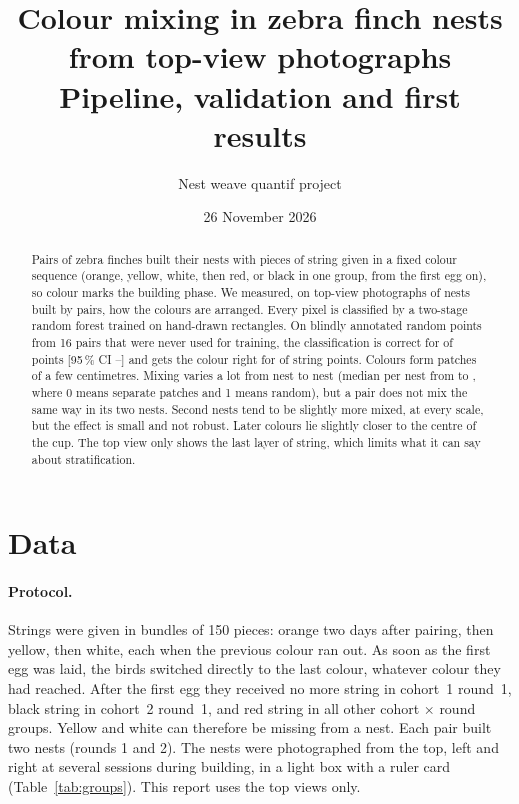 \documentclass[11pt,a4paper]{article}
\title{Colour mixing in zebra finch nests from top-view photographs\\[2pt]
\large Pipeline, validation and first results}
\author{Nest weave quantif project}
\date{26 November 2026}
\begin{document}
\maketitle

\begin{abstract}
Pairs of zebra finches built their nests with pieces of string given in a fixed colour sequence
(orange, yellow, white, then red, or black in one group, from the first egg on), so colour marks
the building phase. We measured, on \nphotos{} top-view photographs of \nnests{} nests built by
\npairs{} pairs, how the colours are arranged. Every pixel is classified by a two-stage random
forest trained on hand-drawn rectangles. On \valn{} blindly annotated random points from 16 pairs
that were never used for training, the classification is correct for \valacc{} of points
[95\,\% CI \valacclo--\valacchi] and gets the colour right for \valcolourok{} of string points.
Colours form patches of a few centimetres. Mixing varies a lot from nest to nest (median per nest from
\nestmixmin{} to \nestmixmax{}, where 0 means separate patches and 1 means random), but a pair does not
mix the same way in its two nests. Second nests tend to be slightly more mixed, at every scale, but the
effect is small and not robust. Later colours lie slightly
closer to the centre of the cup. The top view only shows the last layer of string, which limits
what it can say about stratification.
\end{abstract}

\section{Data}

\paragraph{Protocol.} Strings were given in bundles of 150 pieces: orange two days after pairing,
then yellow, then white, each when the previous colour ran out. As soon as the first egg was laid, the
birds switched directly to the last colour, whatever colour they had reached. After the first egg they
received no more string in cohort~1 round~1, black string in cohort~2 round~1, and red string in all
other cohort $\times$ round groups. Yellow and white can therefore be missing from a nest. Each pair built two nests
(rounds 1 and 2). The nests were photographed from the top, left and right at several sessions during
building, in a light box with a ruler card (Table~\ref{tab:groups}). This report uses the top views
only.
\end{document}
